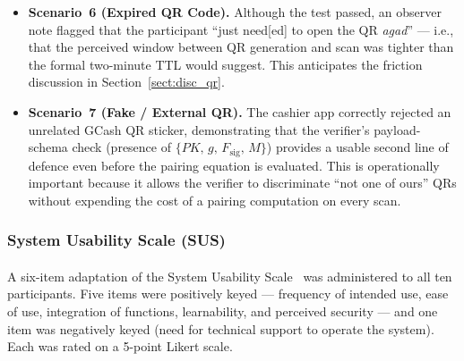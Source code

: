 \begin{itemize}
  \item \textbf{Scenario~6 (Expired QR Code).} Although the test passed, an observer note flagged that the participant ``just need[ed] to open the QR \textit{agad}'' --- i.e., that the perceived window between QR generation and scan was tighter than the formal two-minute TTL would suggest. This anticipates the friction discussion in Section~\ref{sect:disc_qr}.
  \item \textbf{Scenario~7 (Fake / External QR).} The cashier app correctly rejected an unrelated GCash QR sticker, demonstrating that the verifier's payload-schema check (presence of $\{PK,\, g,\, F_{\text{sig}},\, M\}$) provides a usable second line of defence even before the pairing equation is evaluated. This is operationally important because it allows the verifier to discriminate ``not one of ours'' QRs without expending the cost of a pairing computation on every scan.
\end{itemize}

\subsubsection{System Usability Scale (SUS)}
\label{sect:results_uat_sus}

\paragraph{}A six-item adaptation of the System Usability Scale~\cite{brooke1996sus} was administered to all ten participants. Five items were positively keyed --- frequency of intended use, ease of use, integration of functions, learnability, and perceived security --- and one item was negatively keyed (need for technical support to operate the system). Each was rated on a 5-point Likert scale.

